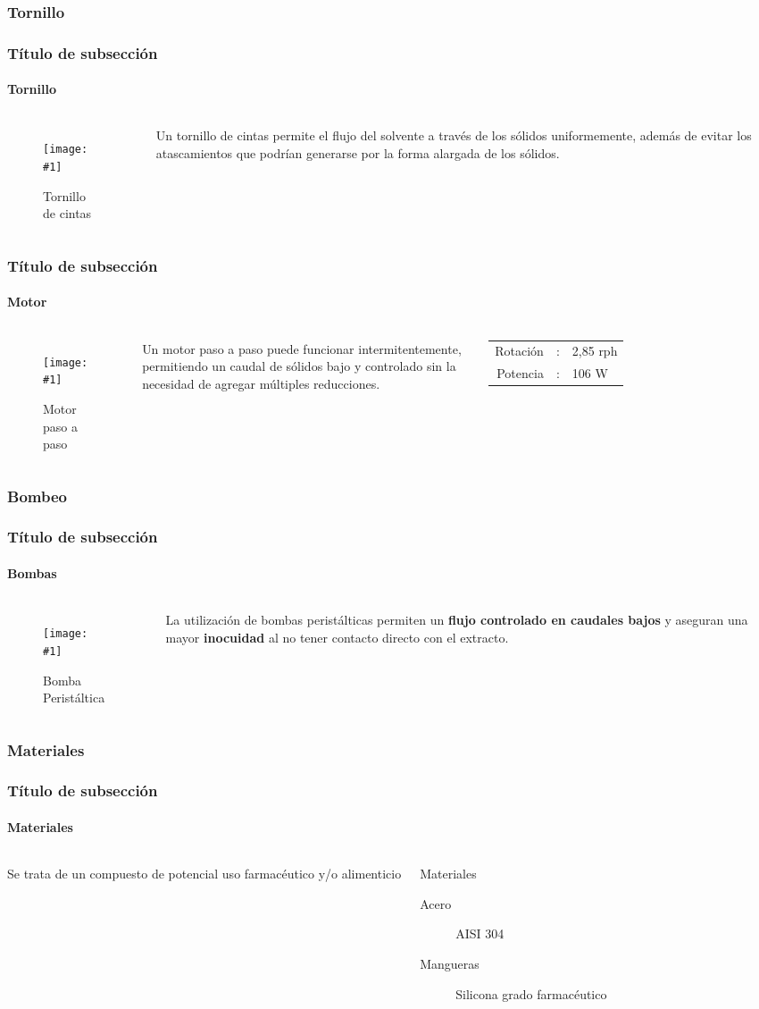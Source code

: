 \documentclass[aspectratio=1610]{beamer}
\newcommand{\fig}[3]{
\begin{columns}
\column{0.4\textwidth}
\begin{figure}[htp] \texttt{[image: \#1]}\caption{#2}\end{figure}
\column{0.6\textwidth}#3
\end{columns}
}
\newcommand{\ssec}{Título de subsección}
\begin{document}
\subsubsection{Tornillo}
\begin{frame}
	\frametitle{\ssec}
	\framesubtitle{Tornillo}
	\fig{figs/ribbon-example.jpeg}{Tornillo de cintas}{
	Un tornillo de cintas permite el flujo del solvente a través de los sólidos uniformemente, además de evitar los atascamientos que podrían generarse por la forma alargada de los sólidos.
	}
\end{frame}
\begin{frame}
	\frametitle{\ssec}
	\framesubtitle{Motor}
	\fig{figs/design-stepmotor.jpg}{Motor paso a paso}{
	Un motor paso a paso puede funcionar intermitentemente, 
	permitiendo un caudal de sólidos bajo y 
	controlado sin la necesidad de agregar múltiples reducciones. \\ ~ \\
	\begin{tabular}{rcl}
		Rotación & : & 2,85 rph \\
		Potencia & : & 106 W \\
	\end{tabular}
	}
\end{frame}

\subsubsection{Bombeo}
\begin{frame}
	\frametitle{\ssec}
	\framesubtitle{Bombas}
	\fig{figs/peristaltic-example.jpeg}{Bomba Peristáltica}{
		La utilización de bombas peristálticas permiten un \textbf{flujo controlado en caudales bajos} y
	aseguran una mayor \textbf{inocuidad} al no tener contacto directo con el extracto.}
\end{frame}

\subsubsection{Materiales}
\begin{frame}
	\frametitle{\ssec}
	\framesubtitle{Materiales}
	\begin{columns}
	Se trata de un compuesto de potencial uso farmacéutico y/o alimenticio
	\begin{block}{Materiales}
	\begin{description}
	\item[Acero] AISI 304
	\item[Mangueras] Silicona grado farmacéutico
	\end{description}
	\end{block}
	\end{columns}
\end{frame}
\end{document}
